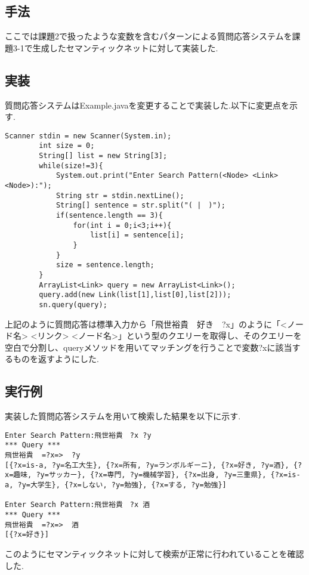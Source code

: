 \documentclass[a4j]{jarticle}
\begin{document}
\subsection{手法}
ここでは課題2で扱ったような変数を含むパターンによる質問応答システムを課題3-1で生成したセマンティックネットに対して実装した.

\subsection{実装}
質問応答システムはExample.javaを変更することで実装した.以下に変更点を示す.
\\
\begin{lstlisting}[caption=MakeSemanticNetクラスより抜粋]
		Scanner stdin = new Scanner(System.in);
		int size = 0;
		String[] list = new String[3];
		while(size!=3){
			System.out.print("Enter Search Pattern(<Node> <Link> <Node>):");
			String str = stdin.nextLine();
			String[] sentence = str.split("( |　)");
			if(sentence.length == 3){
				for(int i = 0;i<3;i++){
					list[i] = sentence[i];
				}
			}
			size = sentence.length;
		}
		ArrayList<Link> query = new ArrayList<Link>();
		query.add(new Link(list[1],list[0],list[2]));
		sn.query(query);
\end{lstlisting}

上記のように質問応答は標準入力から「飛世裕貴　好き　?x」のように「<ノード名> <リンク> <ノード名>」という型のクエリーを取得し、そのクエリーを空白で分割し、queryメソッドを用いてマッチングを行うことで変数?xに該当するものを返すようにした.
\subsection{実行例}
実装した質問応答システムを用いて検索した結果を以下に示す.
\\
\begin{screen}
\begin{verbatim}
Enter Search Pattern:飛世裕貴　?x ?y
*** Query ***
飛世裕貴  =?x=>  ?y
[{?x=is-a, ?y=名工大生}, {?x=所有, ?y=ランボルギーニ}, {?x=好き, ?y=酒}, {?x=趣味, ?y=サッカー}, {?x=専門, ?y=機械学習}, {?x=出身, ?y=三重県}, {?x=is-a, ?y=大学生}, {?x=しない, ?y=勉強}, {?x=する, ?y=勉強}]

Enter Search Pattern:飛世裕貴　?x 酒
*** Query ***
飛世裕貴  =?x=>  酒
[{?x=好き}]
\end{verbatim}
\end{screen}


このようにセマンティックネットに対して検索が正常に行われていることを確認した.
\end{document}
